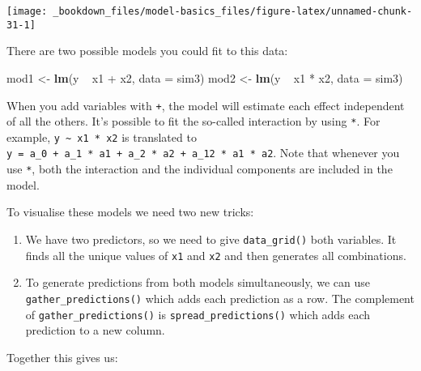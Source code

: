 \documentclass[]{book}
\newenvironment{Shaded}{\begin{snugshade}}{\end{snugshade}}
\newcommand{\KeywordTok}[1]{\textcolor[rgb]{0.13,0.29,0.53}{\textbf{{#1}}}}
\newcommand{\DataTypeTok}[1]{\textcolor[rgb]{0.13,0.29,0.53}{{#1}}}
\newcommand{\StringTok}[1]{\textcolor[rgb]{0.31,0.60,0.02}{{#1}}}
\newcommand{\CommentTok}[1]{\textcolor[rgb]{0.56,0.35,0.01}{\textit{{#1}}}}
\newcommand{\NormalTok}[1]{{#1}}
\begin{document}
\begin{center}\texttt{[image: \_bookdown\_files/model-basics\_files/figure-latex/unnamed-chunk-31-1]} \end{center}

There are two possible models you could fit to this data:

\begin{Shaded}
\begin{Highlighting}[]
\NormalTok{mod1 <-}\StringTok{ }\KeywordTok{lm}\NormalTok{(y ~}\StringTok{ }\NormalTok{x1 +}\StringTok{ }\NormalTok{x2, }\DataTypeTok{data =} \NormalTok{sim3)}
\NormalTok{mod2 <-}\StringTok{ }\KeywordTok{lm}\NormalTok{(y ~}\StringTok{ }\NormalTok{x1 *}\StringTok{ }\NormalTok{x2, }\DataTypeTok{data =} \NormalTok{sim3)}
\end{Highlighting}
\end{Shaded}

When you add variables with \texttt{+}, the model will estimate each
effect independent of all the others. It's possible to fit the so-called
interaction by using \texttt{*}. For example,
\texttt{y\ \textasciitilde{}\ x1\ *\ x2} is translated to
\texttt{y\ =\ a\_0\ +\ a\_1\ *\ a1\ +\ a\_2\ *\ a2\ +\ a\_12\ *\ a1\ *\ a2}.
Note that whenever you use \texttt{*}, both the interaction and the
individual components are included in the model.

To visualise these models we need two new tricks:

\begin{enumerate}
\def\labelenumi{\arabic{enumi}.}
\item
  We have two predictors, so we need to give \texttt{data\_grid()} both
  variables. It finds all the unique values of \texttt{x1} and
  \texttt{x2} and then generates all combinations.
\item
  To generate predictions from both models simultaneously, we can use
  \texttt{gather\_predictions()} which adds each prediction as a row.
  The complement of \texttt{gather\_predictions()} is
  \texttt{spread\_predictions()} which adds each prediction to a new
  column.
\end{enumerate}

Together this gives us:

\begin{Shaded}
\end{Shaded}
\end{document}

